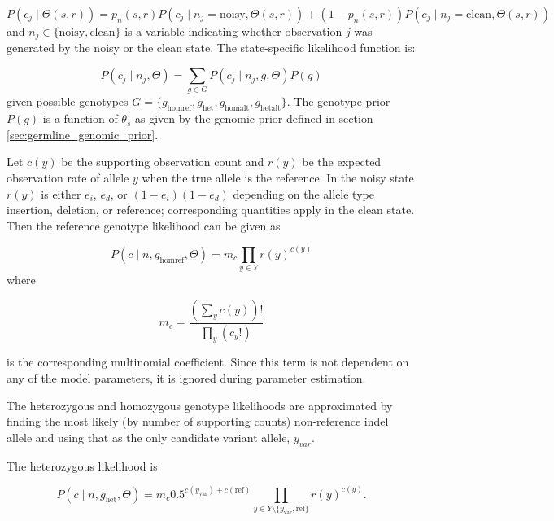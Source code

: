 \documentclass{article}
\begin{document}
\begin{equation*}
P(c_j \mid \Theta(s,r)) = p_n(s,r) P(c_j \mid n_j=\text{noisy}, \Theta(s,r)) + (1-p_n(s,r)) P(c_j \mid n_j=\text{clean}, \Theta(s,r))
\end{equation*}
and $n_j \in \{ \text{noisy}, \text{clean} \}$ is a variable indicating whether observation $j$ was generated by the noisy or the clean state. The state-specific likelihood function is:

\begin{equation*}
P(c_j \mid n_j, \Theta)=\sum_{g\in G}P(c_j \mid n_j, g, \Theta)P(g)
\end{equation*}
given possible genotypes $G=\{ g_{\text{homref}}, g_{\text{het}}, g_{\text{homalt}}, g_{\text{hetalt}} \}$. The genotype prior $P(g)$ is a function of $\theta_s$ as given by the genomic prior defined in section \ref{sec:germline_genomic_prior}.

Let $c(y)$ be the supporting observation count and $r(y)$ be the expected observation rate of allele $y$ when the true allele is the reference. In the noisy state $r(y)$ is either $e_i$, $e_d$, or $(1-e_i)(1-e_d)$ depending on the allele type insertion, deletion, or reference; corresponding quantities apply in the clean state. Then the reference genotype likelihood can be given as

\begin{equation*}
P(c \mid n, g_{\text{homref}}, \Theta)=m_c \prod_{y \in Y}r(y)^{c(y)}
\end{equation*}
where

\begin{equation*}
m_c = \frac{(\sum_{y}{c(y)})!}{\prod_{y}{(c_y!)}}
\end{equation*}

is the corresponding multinomial coefficient. Since this term is not dependent on any of the model parameters, it is ignored during parameter estimation.

The heterozygous and homozygous genotype likelihoods are approximated by finding the most likely (by number of supporting counts) non-reference indel allele and using that as the only candidate variant allele, $y_{var}$.

The heterozygous likelihood is

\begin{equation*}
P (c \mid n, g_{\text{het}}, \Theta) = m_c 0.5^{c(y_{\text{var}}) + c(\text{ref})} \prod_{y \in Y \setminus \{y_{\text{var}},\text{ref}\}} r(y)^{c(y)}.
\end{equation*}
\end{document}
